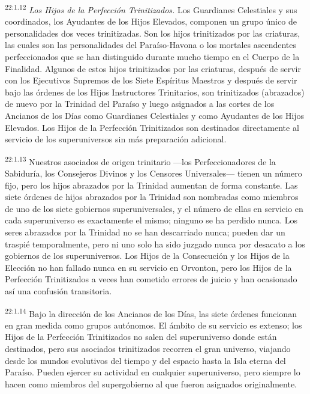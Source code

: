 \par
\textsuperscript{22:1.12} \textit{Los Hijos de la Perfección Trinitizados.} Los Guardianes Celestiales y sus coordinados, los Ayudantes de los Hijos Elevados, componen un grupo único de personalidades dos veces trinitizadas. Son los hijos trinitizados por las criaturas, las cuales son las personalidades del Paraíso-Havona o los mortales ascendentes perfeccionados que se han distinguido durante mucho tiempo en el Cuerpo de la Finalidad. Algunos de estos hijos trinitizados por las criaturas, después de servir con los Ejecutivos Supremos de los Siete Espíritus Maestros y después de servir bajo las órdenes de los Hijos Instructores Trinitarios, son trinitizados (abrazados) de nuevo por la Trinidad del Paraíso y luego asignados a las cortes de los Ancianos de los Días como Guardianes Celestiales y como Ayudantes de los Hijos Elevados. Los Hijos de la Perfección Trinitizados son destinados directamente al servicio de los superuniversos sin más preparación adicional.

\par
\textsuperscript{22:1.13} Nuestros asociados de origen trinitario ---los Perfeccionadores de la Sabiduría, los Consejeros Divinos y los Censores Universales--- tienen un número fijo, pero los hijos abrazados por la Trinidad aumentan de forma constante. Las siete órdenes de hijos abrazados por la Trinidad son nombradas como miembros de uno de los siete gobiernos superuniversales, y el número de ellas en servicio en cada superuniverso es exactamente el mismo; ninguno se ha perdido nunca. Los seres abrazados por la Trinidad no se han descarriado nunca; pueden dar un traspié temporalmente, pero ni uno solo ha sido juzgado nunca por desacato a los gobiernos de los superuniversos. Los Hijos de la Consecución y los Hijos de la Elección no han fallado nunca en su servicio en Orvonton, pero los Hijos de la Perfección Trinitizados a veces han cometido errores de juicio y han ocasionado así una confusión transitoria.

\par
\textsuperscript{22:1.14} Bajo la dirección de los Ancianos de los Días, las siete órdenes funcionan en gran medida como grupos autónomos. El ámbito de su servicio es extenso; los Hijos de la Perfección Trinitizados no salen del superuniverso donde están destinados, pero sus asociados trinitizados recorren el gran universo, viajando desde los mundos evolutivos del tiempo y del espacio hasta la Isla eterna del Paraíso. Pueden ejercer su actividad en cualquier superuniverso, pero siempre lo hacen como miembros del supergobierno al que fueron asignados originalmente.

